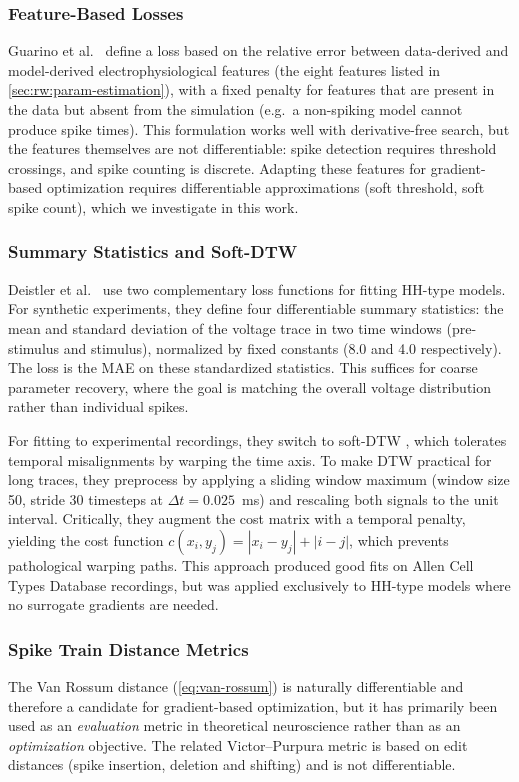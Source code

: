 \subsubsection{Feature-Based Losses}
Guarino et al.\ \cite{Guarino2025} define a loss based on the relative error between data-derived and model-derived electrophysiological features (the eight features listed in \cref{sec:rw:param-estimation}), with a fixed penalty for features that are present in the data but absent from the simulation (e.g.\ a non-spiking model cannot produce spike times).
This formulation works well with derivative-free search, but the features themselves are not differentiable: spike detection requires threshold crossings, and spike counting is discrete.
Adapting these features for gradient-based optimization requires differentiable approximations (soft threshold, soft spike count), which we investigate in this work.

\subsubsection{Summary Statistics and Soft-DTW}
Deistler et al.\ \cite{Deistler2025} use two complementary loss functions for fitting \gls{HH}-type models.
For synthetic experiments, they define four differentiable summary statistics: the mean and standard deviation of the voltage trace in two time windows (pre-stimulus and stimulus), normalized by fixed constants (8.0 and 4.0 respectively).
The loss is the \gls{MAE} on these standardized statistics.
This suffices for coarse parameter recovery, where the goal is matching the overall voltage distribution rather than individual spikes.

For fitting to experimental recordings, they switch to soft-DTW \cite{Blondel2018}, which tolerates temporal misalignments by warping the time axis.
To make DTW practical for long traces, they preprocess by applying a sliding window maximum (window size 50, stride 30 timesteps at $\Delta t = 0.025$~ms) and rescaling both signals to the unit interval.
Critically, they augment the cost matrix with a temporal penalty, yielding the cost function $c(x_i, y_j) = |x_i - y_j| + |i - j|$, which prevents pathological warping paths.
This approach produced good fits on Allen Cell Types Database recordings, but was applied exclusively to \gls{HH}-type models where no surrogate gradients are needed.

\subsubsection{Spike Train Distance Metrics}
The Van Rossum distance \cite{Rossum2001} (\cref{eq:van-rossum}) is naturally differentiable and therefore a candidate for gradient-based optimization, but it has primarily been used as an \emph{evaluation} metric in theoretical neuroscience rather than as an \emph{optimization} objective.
The related Victor--Purpura metric is based on edit distances (spike insertion, deletion and shifting) and is not differentiable.

